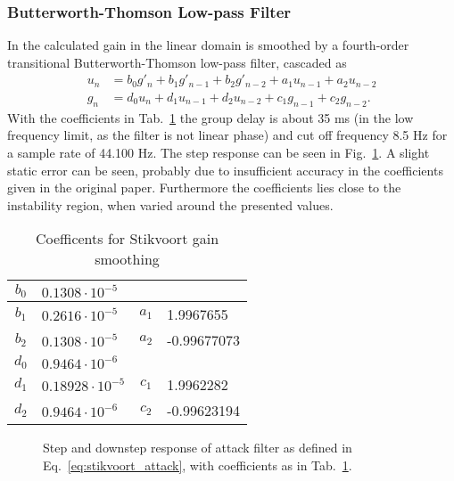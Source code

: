 \documentclass[../main2.tex]{subfiles}
\providecommand{\rootdir}{..}
\begin{document}
\subsubsection{Butterworth-Thomson Low-pass Filter}
In \cite{stikvoort1986digital} the calculated gain in the linear domain is smoothed by a fourth-order transitional Butterworth-Thomson low-pass filter, cascaded as
\begin{equation}\label{eq:stikvoort_attack}
\begin{split}
u_n &= b_0 g'_n + b_1 g'_{n-1} + b_2 g'_{n-2} + a_1 u_{n-1} + a_2 u_{n-2}\\
g_n &= d_0 u_n + d_1 u_{n-1} + d_2 u_{n-2} + c_1 g_{n-1} + c_2 g_{n-2}.
\end{split}
\end{equation}
With the coefficients in Tab.~\ref{tab:coeff_stikvoort_attack}  the group delay is about 35 ms (in the low frequency limit, as the filter is not linear phase) and cut off frequency 8.5 Hz for a sample rate of 44.100 Hz. The step response can be seen in Fig.~\ref{fig:step_stikvoort_attack}. A slight static error can be seen, probably due to insufficient accuracy in the coefficients given in the original paper. Furthermore the coefficients lies close to the instability region, when varied around the presented values.
\begin{table}[h]
\begin{center}
\caption{Coefficents for Stikvoort gain smoothing}
\label{tab:coeff_stikvoort_attack}
 \begin{tabular}{ c l | c l}	
    \hline
    $b_0$ & $0.1308 \cdot 10^{-5}$ &              &                          \\ \hline
    $b_1$ & $0.2616 \cdot 10^{-5}$ & $a_1$ & 1.9967655     \\ \hline
    $b_2$ & $0.1308 \cdot 10^{-5}$ & $a_2$ & -0.99677073  \\ \hline \hline

    $d_0$ & $0.9464  \cdot 10^{-6}$   &         &                             \\ \hline
    $d_1$ & $0.18928 \cdot 10^{-5}$ & $c_1$ & 1.9962282     \\ \hline
    $d_2$ & $0.9464  \cdot 10^{-6}$  & $c_2$ & -0.99623194  \\ \hline
\end{tabular}
\end{center}
\end{table}
\begin{figure}
\centerline{}
\caption{Step and downstep response of attack filter as defined in Eq.~\eqref{eq:stikvoort_attack}, with coefficients as in Tab.~\ref{tab:coeff_stikvoort_attack}.}
\label{fig:step_stikvoort_attack}
\end{figure}
\end{document}
